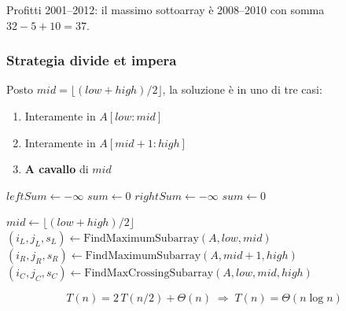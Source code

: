 \begin{esempio}
	Profitti 2001--2012: il massimo sottoarray è 2008--2010 con somma
	$32 - 5 + 10 = 37$.
\end{esempio}

\subsubsection*{Strategia divide et impera}

Posto $mid = \lfloor(low+high)/2\rfloor$, la soluzione è in uno di tre casi:
\begin{enumerate}
	\item Interamente in $A[low:mid]$
	\item Interamente in $A[mid+1:high]$
	\item \textbf{A cavallo} di $mid$
\end{enumerate}

\begin{algorithm}[H]
	\caption{FindMaxCrossingSubarray($A$, $low$, $mid$, $high$)}
	$\mathit{leftSum} \gets -\infty$\; $\mathit{sum} \gets 0$\;
	$\mathit{rightSum} \gets -\infty$\; $\mathit{sum} \gets 0$\;
	\;
\end{algorithm}

\begin{algorithm}[H]
	\caption{FindMaximumSubarray($A$, $low$, $high$)}
	$mid \gets \lfloor(low+high)/2\rfloor$\;
	$(i_L, j_L, s_L) \gets \text{FindMaximumSubarray}(A, low, mid)$\;
	$(i_R, j_R, s_R) \gets \text{FindMaximumSubarray}(A, mid+1, high)$\;
	$(i_C, j_C, s_C) \gets \text{FindMaxCrossingSubarray}(A,low,mid,high)$\;
	\;
\end{algorithm}

\[
T(n) = 2\,T(n/2) + \Theta(n) \;\Rightarrow\; T(n) = \Theta(n \log n)
\]

